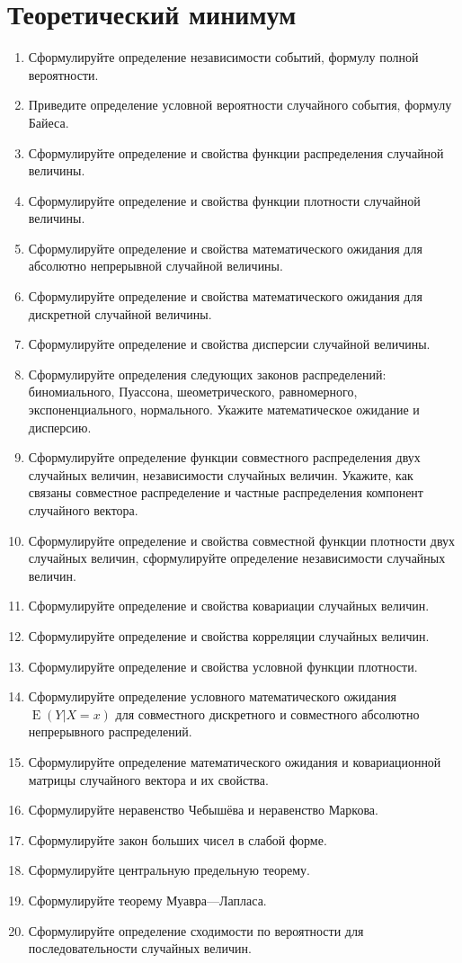 \documentclass[12pt]{article}
\DeclareMathOperator{\E}{E}
\begin{document}
\section{Теоретический минимум}

\begin{enumerate}
\item Сформулируйте определение независимости событий, формулу полной вероятности.
\item Приведите определение условной вероятности случайного события, формулу Байеса.
\item Сформулируйте определение и свойства функции распределения случайной величины.
\item Сформулируйте определение и свойства функции плотности случайной величины.
\item Сформулируйте определение и свойства математического ожидания для абсолютно непрерывной случайной величины.
\item Сформулируйте определение и свойства математического ожидания для дискретной случайной величины.
\item Сформулируйте определение и свойства дисперсии случайной величины.
\item Сформулируйте определения следующих законов распределений: биномиального, Пуассона, шеометрического, равномерного, экспоненциального, нормального. Укажите математическое ожидание и дисперсию.
\item Сформулируйте определение функции совместного распределения двух случайных величин, независимости случайных величин. Укажите, как связаны совместное распределение и частные распределения компонент случайного вектора.
\item	Сформулируйте определение и свойства совместной функции плотности двух случайных величин, сформулируйте определение независимости случайных величин.
\item Сформулируйте определение и свойства ковариации случайных величин.
\item Сформулируйте определение и свойства корреляции случайных величин.
\item Сформулируйте определение и свойства условной функции плотности.
\item Сформулируйте определение  условного математического ожидания $\E(Y|X=x)$ для совместного дискретного и совместного абсолютно непрерывного распределений.
\item Сформулируйте определение математического ожидания и ковариационной матрицы случайного вектора и их свойства.
\item Сформулируйте неравенство Чебышёва и неравенство Маркова.
\item Сформулируйте закон больших чисел в слабой форме.
\item Сформулируйте центральную предельную теорему.
\item Сформулируйте теорему Муавра—Лапласа.
\item Сформулируйте определение сходимости по вероятности для последовательности случайных величин.

\end{enumerate}
\end{document}
